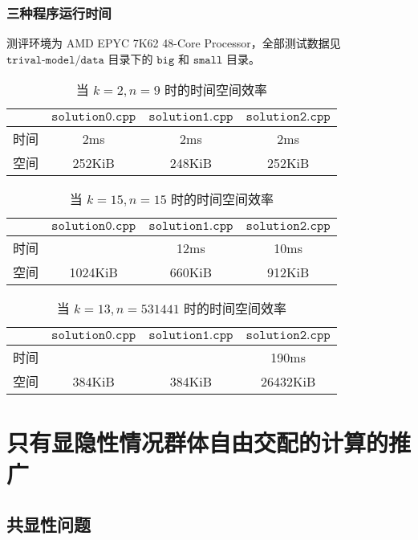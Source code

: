 \documentclass[12pt]{article} %
\begin{document}
\subsubsection*{三种程序运行时间}

测评环境为 AMD EPYC 7K62 48-Core Processor，全部测试数据见 $\texttt{trival-model/data}$ 目录下的 $\texttt{big}$ 和 $\texttt{small}$ 目录。

\begin{table}[htbp]
	\centering
	\caption{当 $k=2,n=9$ 时的时间空间效率}
	\begin{tabular}{c|c|c|c}
		& $\texttt{solution0.cpp}$ & $\texttt{solution1.cpp}$ & $\texttt{solution2.cpp}$ \\ \hline
		时间 & 2ms & 2ms & 2ms \\ \hline
		空间 & 252KiB & 248KiB & 252KiB
	\end{tabular}
\end{table}

\begin{table}[htbp]
	\centering
	\caption{当 $k=15,n=15$ 时的时间空间效率}
	\begin{tabular}{c|c|c|c}
		& $\texttt{solution0.cpp}$ & $\texttt{solution1.cpp}$ & $\texttt{solution2.cpp}$ \\ \hline
		时间 & \color{red}{>1000ms} & 12ms & 10ms \\ \hline
		空间 & 1024KiB & 660KiB & 912KiB
	\end{tabular}
\end{table}

\begin{table}[htbp]
	\centering
	\caption{当 $k=13,n=531441$ 时的时间空间效率}
	\begin{tabular}{c|c|c|c}
		& $\texttt{solution0.cpp}$ & $\texttt{solution1.cpp}$ & $\texttt{solution2.cpp}$ \\ \hline
		时间 & \color{red}{>1000ms} & \color{red}{>1000ms} & 190ms \\ \hline
		空间 & 384KiB & 384KiB & 26432KiB
	\end{tabular}
\end{table}

\newpage

\section{只有显隐性情况群体自由交配的计算的推广}

\subsection{共显性问题}
\end{document}
